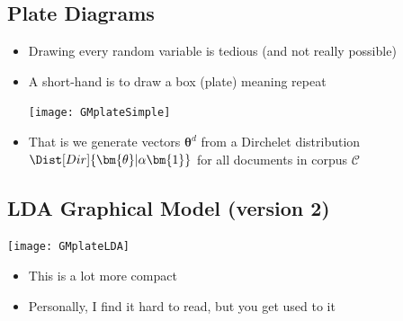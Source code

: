 
\begin{slide}
\section{Plate Diagrams}

\begin{PauseHighLight}
  \begin{itemize}
  \item Drawing every random variable is tedious (and not really
    possible)\pause
  \item A short-hand is to draw a box (plate) meaning repeat
    \begin{center}
      \texttt{[image: GMplateSimple]}\pause
    \end{center}
  \item That is we generate vectors $\bm{\theta}^{d}$ from a Dirchelet
    distribution $\Dist[Dir]{\bm{\theta}|\alpha \bm{1}}$ for all
    documents in corpus $\mathcal{C}$\pause
  \end{itemize}
\end{PauseHighLight}

\end{slide}



\begin{slide}
\section{LDA Graphical Model (version 2)}

\begin{center}
  \texttt{[image: GMplateLDA]}
\end{center}
\begin{PauseHighLight}
  \begin{itemize}
  \item This is a lot more compact\pause
  \item Personally, I find it hard to read, but you get used to it\pause
  \end{itemize}
\end{PauseHighLight}

\end{slide}


